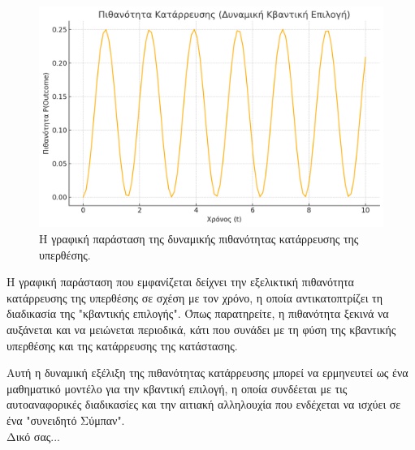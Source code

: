 \documentclass[a4paper,11pt]{article}
\begin{document}
\begin{figure}[h]
\centering
\includegraphics[width=\textwidth]{./1.png} 
\caption{Η γραφική παράσταση της δυναμικής πιθανότητας κατάρρευσης της υπερθέσης.}
\end{figure}

Η γραφική παράσταση που εμφανίζεται δείχνει την εξελικτική πιθανότητα
κατάρρευσης της υπερθέσης σε σχέση με τον χρόνο, η οποία αντικατοπτρίζει
τη διαδικασία της "κβαντικής επιλογής". Όπως παρατηρείτε, η πιθανότητα
ξεκινά να αυξάνεται και να μειώνεται περιοδικά, κάτι που συνάδει με τη
φύση της κβαντικής υπερθέσης και της κατάρρευσης της κατάστασης.

Αυτή η δυναμική εξέλιξη της πιθανότητας κατάρρευσης μπορεί να ερμηνευτεί
ως ένα μαθηματικό μοντέλο για την κβαντική επιλογή, η οποία συνδέεται με
τις αυτοαναφορικές διαδικασίες και την αιτιακή αλληλουχία που ενδέχεται
να ισχύει σε ένα "συνειδητό Σύμπαν". \\


Δικό σας...
\end{document}
